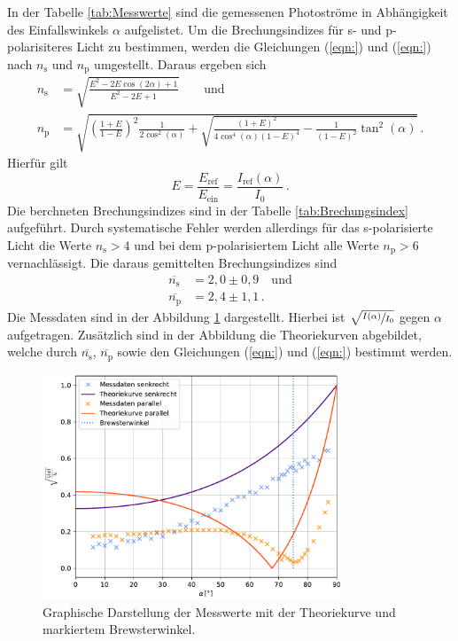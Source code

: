 In der Tabelle \ref{tab:Messwerte} sind die gemessenen Photoströme in Abhängigkeit des Einfallswinkels $\alpha$ aufgelistet.
Um die Brechungsindizes für s- und p-polarisiteres Licht zu bestimmen, werden die Gleichungen (\ref{eqn:}) und (\ref{eqn:}) nach $n_{\text{s}}$ und $n_{\text{p}}$
umgestellt. Daraus ergeben sich
\begin{align}
  n_{\text{s}} &= \sqrt{\frac{E^2 - 2E\cos(2\alpha) + 1}{E^2- 2E + 1}} \label{eqn:n_s} \qquad {\text{und}}\\
  n_{\text{p}} &= \sqrt{\left(\frac{1+E}{1-E}\right)^2 \frac{1}{2\cos^2(\alpha)} + \sqrt{\frac{(1+E)^2}{4\cos^4(\alpha)(1-E)^4}- \frac{1}{(1-E)^2} \tan^2(\alpha)}} \label{eqn:n_p}\,.
\end{align}
Hierfür gilt $$E = \frac{E_{\text{ref}}}{E_{\text{ein}}} = \frac{I_{\text{ref}}(\alpha)}{I_0}\,.$$
Die berchneten Brechungsindizes sind in der Tabelle \ref{tab:Brechungsindex} aufgeführt. Durch systematische Fehler werden allerdings für das s-polarisierte Licht
die Werte $n_{\text{s}} > 4$ und bei dem p-polarisiertem Licht alle Werte $n_{\text{p}} > 6$ vernachlässigt. Die daraus gemittelten Brechungsindizes sind
\begin{align*}
  \overline{n_{\text{s}}} &= 2,0\pm 0,9\quad \text{und}\\
  \overline{n_{\text{p}}} &= 2,4\pm 1,1\,.
\end{align*}
Die Messdaten sind in der Abbildung \ref{fig:plot} dargestellt. Hierbei ist $\sqrt{\sfrac{I(\alpha)}{I_0}}$ gegen $\alpha$ aufgetragen. Zusätzlich sind in der Abbildung
die Theoriekurven abgebildet, welche durch $\overline{n_{\text{s}}}$, $\overline{n_{\text{p}}}$ sowie den Gleichungen (\ref{eqn:}) und (\ref{eqn:}) bestimmt werden.
\begin{figure}
  \centering
  \includegraphics[width=0.8\textwidth]{plot.pdf}
  \caption{Graphische Darstellung der Messwerte mit der Theoriekurve und markiertem Brewsterwinkel.}
  \label{fig:plot}
\end{figure}
